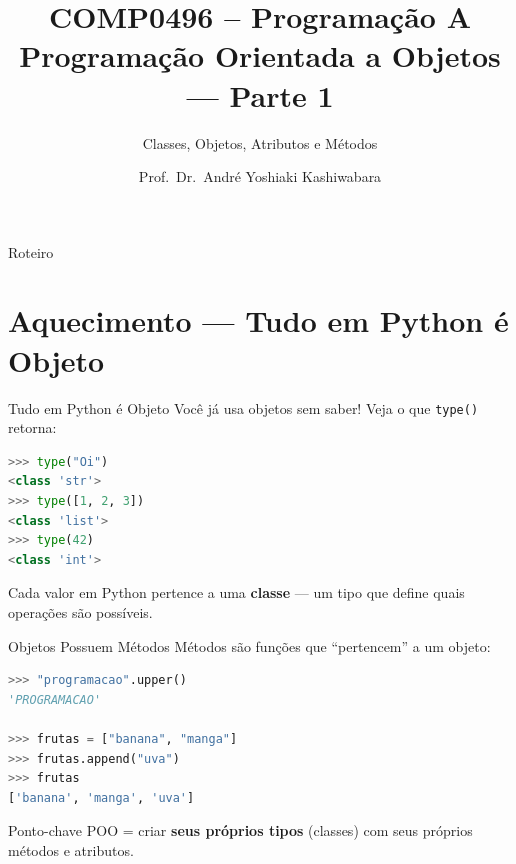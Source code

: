 \documentclass[aspectratio=169]{beamer}
\title{COMP0496 -- Programação A \\ Programação Orientada a Objetos --- Parte 1}
\subtitle{Classes, Objetos, Atributos e Métodos}
\author{Prof.\ Dr.\ André Yoshiaki Kashiwabara}
\institute{DCOMP -- Universidade Federal de Sergipe\\
\texttt{andreyoshiaki@dcomp.ufs.br}}
\date{}
\begin{document}
\begin{frame}[plain]
  \titlepage
\end{frame}

\begin{frame}{Roteiro}
  \tableofcontents
\end{frame}

\section{Aquecimento --- Tudo em Python é Objeto}

\begin{frame}[fragile]{Tudo em Python é Objeto}
  Você já usa objetos sem saber! Veja o que \texttt{type()} retorna:

  \begin{lstlisting}[language=Python]
>>> type("Oi")
<class 'str'>
>>> type([1, 2, 3])
<class 'list'>
>>> type(42)
<class 'int'>
  \end{lstlisting}

  \vspace{0.3cm}
  Cada valor em Python pertence a uma \textbf{classe} --- um tipo que define
  quais operações são possíveis.
\end{frame}

\begin{frame}[fragile]{Objetos Possuem Métodos}
  Métodos são funções que ``pertencem'' a um objeto:

  \begin{lstlisting}[language=Python]
>>> "programacao".upper()
'PROGRAMACAO'

>>> frutas = ["banana", "manga"]
>>> frutas.append("uva")
>>> frutas
['banana', 'manga', 'uva']
  \end{lstlisting}

  \vspace{0.3cm}
  \begin{block}{Ponto-chave}
    POO = criar \textbf{seus próprios tipos} (classes)
    com seus próprios métodos e atributos.
  \end{block}
\end{frame}
\end{document}
